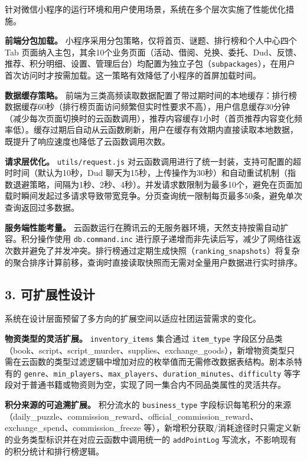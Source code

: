 \documentclass[a4paper,12pt]{article}
\begin{document}
针对微信小程序的运行环境和用户使用场景，系统在多个层次实施了性能优化措施。

\textbf{前端分包加载。} 小程序采用分包策略，仅将首页、谜题、排行榜和个人中心四个 Tab 页面纳入主包，其余10个业务页面（活动、借阅、兑换、委托、Dud、反馈、推荐、积分明细、设置、管理后台）均配置为独立子包（\texttt{subpackages}），在用户首次访问时才按需加载。这一策略有效降低了小程序的首屏加载时间。

\textbf{数据缓存策略。} 前端为三类高频读取数据配置了带过期时间的本地缓存：排行榜数据缓存60秒（排行榜页面访问频繁但实时性要求不高），用户信息缓存30分钟（减少每次页面切换时的云函数调用），推荐内容缓存1小时（首页推荐内容变化频率低）。缓存过期后自动从云函数刷新，用户在缓存有效期内直接读取本地数据，既提升了响应速度也降低了云函数调用次数。

\textbf{请求层优化。} \texttt{utils/request.js} 对云函数调用进行了统一封装，支持可配置的超时时间（默认为10秒，Dud 聊天为15秒，上传操作为30秒）和自动重试机制（指数退避策略，间隔为1秒、2秒、4秒）。并发请求数限制为最多10个，避免在页面加载时瞬间发起过多请求导致带宽竞争。分页查询统一限制每页最多50条，避免单次查询返回过多数据。

\textbf{服务端性能考量。} 云函数运行在腾讯云的无服务器环境，天然支持按需自动扩容。积分操作使用 \texttt{db.command.inc} 进行原子递增而非先读后写，减少了网络往返次数并避免了并发冲突。排行榜通过定期生成快照（\texttt{ranking\_snapshots}）将复杂的聚合排序计算前移，查询时直接读取快照而无需对全量用户数据进行实时排序。

\subsection{3. 可扩展性设计}

系统在设计层面预留了多方向的扩展空间以适应社团运营需求的变化。

\textbf{物资类型的灵活扩展。} \texttt{inventory\_items} 集合通过 \texttt{item\_type} 字段区分品类（book、script、script\_murder、supplies、exchange\_goods），新增物资类型只需在云函数的类型过滤逻辑中增加对应的枚举值而无需修改数据表结构。剧本杀特有的 \texttt{genre}、\texttt{min\_players}、\texttt{max\_players}、\texttt{duration\_minutes}、\texttt{difficulty} 等字段对于普通书籍或物资则为空，实现了同一集合内不同品类属性的灵活共存。

\textbf{积分来源的可追溯扩展。} 积分流水的 \texttt{business\_type} 字段标识每笔积分的来源（daily\_puzzle、commission\_reward、official\_commission\_reward、exchange\_spend、commission\_freeze 等），新增积分获取/消耗途径时只需定义新的业务类型标识并在对应云函数中调用统一的 \texttt{addPointLog} 写流水，不影响现有的积分统计和排行榜逻辑。
\end{document}

